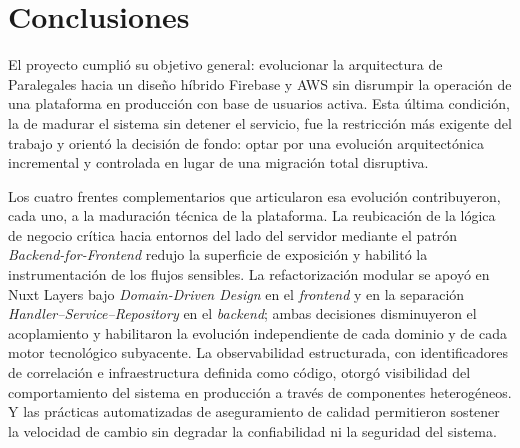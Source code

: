 \section{Conclusiones}

El proyecto cumplió su objetivo general: evolucionar la arquitectura de Paralegales hacia un diseño híbrido Firebase y AWS sin disrumpir la operación de una plataforma en producción con base de usuarios activa. Esta última condición, la de madurar el sistema sin detener el servicio, fue la restricción más exigente del trabajo y orientó la decisión de fondo: optar por una evolución arquitectónica incremental y controlada en lugar de una migración total disruptiva.

Los cuatro frentes complementarios que articularon esa evolución contribuyeron, cada uno, a la maduración técnica de la plataforma. La reubicación de la lógica de negocio crítica hacia entornos del lado del servidor mediante el patrón \textit{Backend-for-Frontend} redujo la superficie de exposición y habilitó la instrumentación de los flujos sensibles. La refactorización modular se apoyó en Nuxt Layers bajo \textit{Domain-Driven Design} en el \textit{frontend} y en la separación \textit{Handler--Service--Repository} en el \textit{backend}; ambas decisiones disminuyeron el acoplamiento y habilitaron la evolución independiente de cada dominio y de cada motor tecnológico subyacente. La observabilidad estructurada, con identificadores de correlación e infraestructura definida como código, otorgó visibilidad del comportamiento del sistema en producción a través de componentes heterogéneos. Y las prácticas automatizadas de aseguramiento de calidad permitieron sostener la velocidad de cambio sin degradar la confiabilidad ni la seguridad del sistema.

